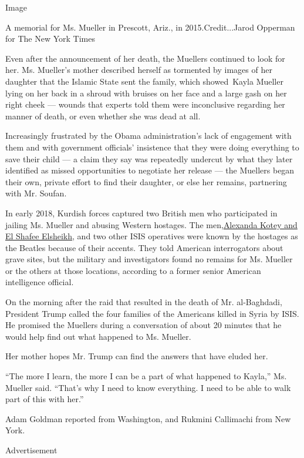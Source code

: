 Image

A memorial for Ms. Mueller in Prescott, Ariz., in 2015.Credit...Jarod
Opperman for The New York Times

Even after the announcement of her death, the Muellers continued to look
for her. Ms. Mueller's mother described herself as tormented by images
of her daughter that the Islamic State sent the family, which
showed~Kayla Mueller lying on her back in a shroud with bruises on her
face and a large gash on her right cheek --- wounds that experts told
them were inconclusive regarding her manner of death, or even whether
she was dead at all.

Increasingly frustrated by the Obama administration's lack of engagement
with them and with government officials' insistence that they were doing
everything to save their child --- a claim they say was repeatedly
undercut by what they later identified as missed opportunities to
negotiate her release --- the Muellers began their own, private effort
to find their daughter, or else her remains, partnering with Mr. Soufan.

In early 2018, Kurdish forces captured two British men who participated
in jailing Ms. Mueller and abusing Western hostages. The
men,\href{https://www.nytimes3xbfgragh.onion/2018/02/08/us/politics/britons-detained-american-hostages-syria.html}{Alexanda
Kotey and El Shafee Elsheikh}, and two other ISIS operatives were known
by the hostages as the Beatles because of their accents. They told
American interrogators about grave sites, but the military and
investigators found no remains for Ms. Mueller or the others at those
locations, according to a former senior American intelligence official.

On the morning after the raid that resulted in the death of Mr.
al-Baghdadi, President Trump called the four families of the Americans
killed in Syria by ISIS. He promised the Muellers during a conversation
of about 20 minutes that he would help find out what happened to Ms.
Mueller.

Her mother hopes Mr. Trump can find the answers that have eluded her.

``The more I learn, the more I can be a part of what happened to
Kayla,'' Ms. Mueller said. ``That's why I need to know everything. I
need to be able to walk part of this with her.''

Adam Goldman reported from Washington, and Rukmini Callimachi from New
York.

Advertisement

